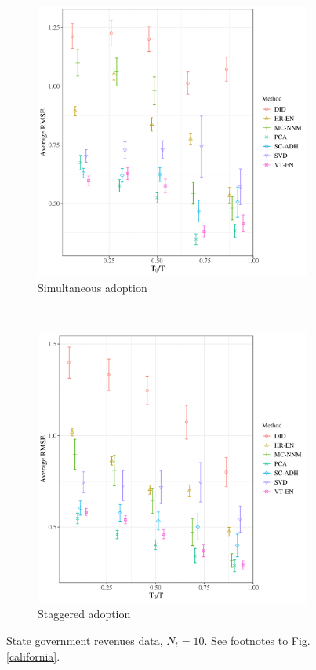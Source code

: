 \documentclass[12pt]{article}
\begin{document}
\begin{figure}[htbp]
	\centering
	\begin{subfigure}[t]{0.45\textwidth}
		\centering
		\includegraphics[width=\textwidth]{plots/rev_pc_N_19_T_158_numruns_20_num_treated_10_simultaneuous_1.png}
		\caption{Simultaneous adoption} 
	\end{subfigure}
	~ 
	\begin{subfigure}[t]{0.45\textwidth}
		\centering
		\includegraphics[width=\textwidth]{plots/rev_pc_N_19_T_158_numruns_20_num_treated_10_simultaneuous_0.png}
		\caption{Staggered adoption}
	\end{subfigure}
	\caption{State government revenues data, $N_t = 10$. See footnotes to Fig. \ref{california}. \label{rev-pc}} 
\end{figure}
\end{document}
